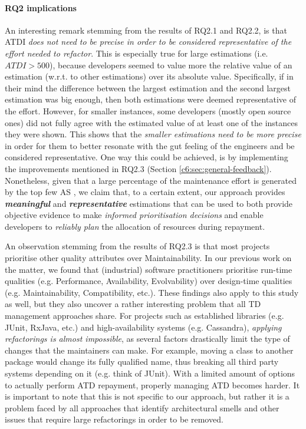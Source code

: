 \paragraph{RQ2 implications}
An interesting remark stemming from the results of RQ2.1 and RQ2.2, is that ATDI \emph{does not need to be precise in order to be considered representative of the effort needed to refactor}.
This is especially true for large estimations (i.e. $ATDI > 500$), because developers seemed to value more the relative value of an estimation (w.r.t. to other estimations) over its absolute value.
Specifically, if in their mind the difference between the largest estimation and the second largest estimation was big enough, then both estimations were deemed representative of the effort. 
However, for smaller instances, some developers (mostly open source ones) did not fully agree with the estimated value of at least one of the instances they were shown.
This shows that the \emph{smaller estimations need to be more precise} in order for them to better resonate with the gut feeling of the engineers and be considered representative.
One way this could be achieved, is by implementing the improvements mentioned in RQ2.3 (Section \ref{c6:sec:general-feedback}).
Nonetheless, given that a large percentage of the maintenance effort is generated by the top few AS \cite{Xiao2016}, we claim that, to a certain extent, our approach provides \emph{\textbf{meaningful}} and \emph{\textbf{representative}} estimations that can be used to both provide objective evidence to make \emph{informed prioritisation decisions} and enable developers to \emph{reliably plan} the allocation of resources during repayment. 

An observation stemming from the results of RQ2.3 is that most projects prioritise other quality attributes over Maintainability.
In our previous work \cite{Sas2020b} on the matter, we found that (industrial) software practitioners prioritise run-time qualities (e.g. Performance, Availability, Evolvability) over design-time qualities (e.g. Maintainability, Compatibility, etc.).
These findings also apply to this study as well, but they also uncover a rather interesting problem that all TD management approaches share.
For projects such as established libraries (e.g. JUnit, RxJava, etc.) and high-availability systems (e.g. Cassandra), \emph{applying refactorings is almost impossible}, as several factors drastically limit the type of changes that the maintainers can make.
For example, moving a class to another package would change its fully qualified name, thus breaking all third party systems depending on it (e.g. think of JUnit).
With a limited amount of options to actually perform ATD repayment, properly managing ATD becomes harder.
It is important to note that this is not specific to our approach, but rather it is a problem faced by all approaches that identify architectural smells and other issues that require large refactorings in order to be removed.

